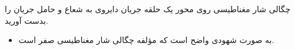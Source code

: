 \begin{ELexample}{}

چگالی شار مغناطیسی روی محور یک حلقه جریان دایروی به شعاع  و حامل جریان  را بدست آورید.


\begin{ELsolution}


\begin{itemize}
\tightlist
\item
  به صورت شهودی واضح است که مؤلفه  چگالی شار مغناطیسی صفر است.
\end{itemize}

\begin{ELimportant}{}


\end{ELimportant}

\end{ELsolution}

\end{ELexample}


